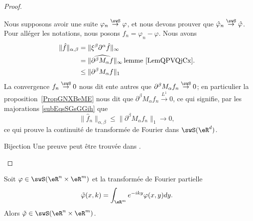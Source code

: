 \begin{proof}
\begin{subproof}
            Nous supposons avoir une suite \( \varphi_n\stackrel{\swS}{\to}\varphi\), et nous devons prouver que \( \hat\varphi_n\stackrel{\swS}{\to}\hat\varphi\). Pour alléger les notations, nous posons \( f_n=\varphi_n-\varphi\). Nous avons
            \begin{subequations}    \label{subEqsSGsGGih}
                \begin{align}
                    \| \hat f \|_{\alpha,\beta}&=\| \xi^{\beta}\partial^{\alpha}\hat f \|_{\infty}\\
                    &=\| \widehat{  \partial^{\beta}M_{\alpha}f  } \|_{\infty}\,\text{lemme~\ref{LemQPVQjCx}.}\\
                    &\leq \| \partial^{\beta}M_{\alpha}f \|_1
                \end{align}
            \end{subequations}
            La convergence \(f_n\stackrel{\swS}{\to}0\) nous dit ente autres que \( \partial^{\beta}M_{\alpha}f_n\stackrel{\swS}{\to}0\); en particulier la proposition~\ref{PropGNXBeME} nous dit que \( \partial^{\beta}M_{\alpha}f_n\stackrel{L^1}{\to}0\), ce qui signifie, par les majorations \eqref{subEqsSGsGGih} que
            \begin{equation}
                \| \hat f_n \|_{\alpha,\beta}\leq \| \partial^{\beta}M_{\alpha}f_n \|_1\to0,
            \end{equation}
            ce qui prouve la continuité de transformée de Fourier dans \( \swS(\eR^d)\).
        \item[Bijection]
            Une preuve peut être trouvée dans \cite{BMoNzTY}.
    \end{subproof}
\end{proof}

\begin{proposition}     \label{PROPooMVQMooGYAzSX}
    Soit \( \varphi\in\swS(\eR^n\times \eR^m)\) et la transformée de Fourier partielle
    \begin{equation}
        \tilde \varphi(x,k)=\int_{\eR^m}  e^{-iky}\varphi(x,y)dy.
    \end{equation}
    Alors \( \tilde \varphi\in\swS(\eR^n\times \eR^m  )\).
\end{proposition}

